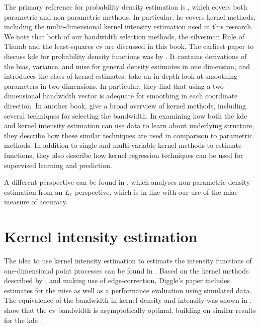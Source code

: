 The primary reference for probability density estimation is \citet{silverman1986density},
which covers both parametric and non-parametric methods.
In particular,
he covers kernel methods,
including the multi-dimensional \gls{kernel intensity estimation} used in this research.
We note that both of our bandwidth selection methods,
the \Gls{silverman} Rule of Thumb and the least-squares \acrlong{cv} are discussed in this book.
The earliest paper to discuss \gls{kde} for probability density functions was by \citet{rosenblatt1956remarks}.
It contains derivations of the bias, variance,
and \acrfull{mise} for general density estimates in one dimension,
and introduces the class of kernel estimates.
 take an in-depth look at smoothing parameters in two dimensions.
In particular,
they find that using a two-dimensional bandwidth vector is adequate for smoothing in each coordinate direction.
In another book, \citet{wand1994kernel}
give a broad overview of kernel methods,
including several techniques for selecting the bandwidth.
In examining how both the \gls{kde} and \gls{kernel intensity estimation} can use data to learn about underlying structure,
they describe how these similar techniques are used in comparison to parametric methods.
In addition to single and multi-variable kernel methods to estimate functions,
they also describe how kernel regression techniques can be used for supervised learning and prediction.

A different perspective can be found in \citet{devroye1985nonparametric},
which analyses non-parametric density estimation from an $L_1$ perspective,
which is in line with our use of the \gls{miae} measure of accuracy.

\section{Kernel intensity estimation}

The idea to use \gls{kernel intensity estimation} to estimate the intensity functions of one-dimensional point processes can be found in \citet{diggle1985kernel}.
Based on the kernel methods described by \citet{rosenblatt1956remarks},
and making use of edge-correction,
Diggle's paper includes estimates for the \gls{mise} as well as a performance evaluation using simulated data.
The equivalence of the bandwidth in kernel density and intensity was shown in \citet{diggle1988equivalence}.
 show that the \gls{cv} bandwidth is asymptotically optimal,
building on similar results for the \gls{kde} \citep{hall1983large,burman1985data,stone1984asymptotically}.

